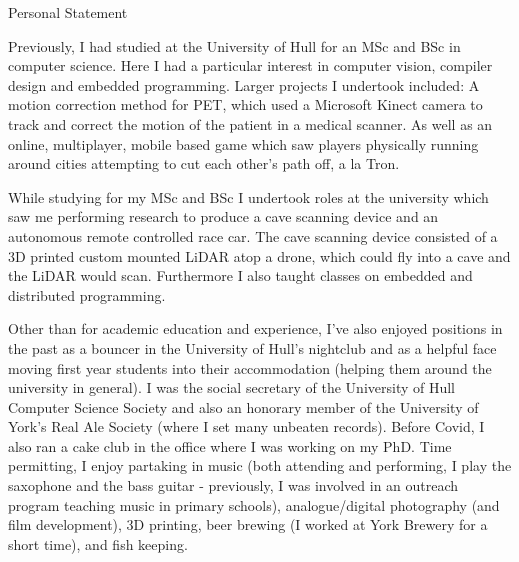 \documentclass{cv}
\begin{document}
\begin{rSection}{Personal Statement}
        \item Previously, I had studied at the University of Hull for an MSc and BSc in computer science. Here I had a particular interest in computer vision, compiler design and embedded programming. Larger projects I undertook included: A motion correction method for PET, which used a Microsoft Kinect camera to track and correct the motion of the patient in a medical scanner. As well as an online, multiplayer, mobile based game which saw players physically running around cities attempting to cut each other's path off, a la Tron.
        
        \item While studying for my MSc and BSc I undertook roles at the university which saw me performing research to produce a cave scanning device and an autonomous remote controlled race car. The cave scanning device consisted of a 3D printed custom mounted LiDAR atop a drone, which could fly into a cave and the LiDAR would scan. Furthermore I also taught classes on embedded and distributed programming.
        
        \item Other than for academic education and experience, I've also enjoyed positions in the past as a bouncer in the University of Hull's nightclub and as a helpful face moving first year students into their accommodation (helping them around the university in general). I was the social secretary of the University of Hull Computer Science Society and also an honorary member of the University of York's Real Ale Society (where I set many unbeaten records). Before Covid, I also ran a cake club in the office where I was working on my PhD. Time permitting, I enjoy partaking in music (both attending and performing, I play the saxophone and the bass guitar - previously, I was involved in an outreach program teaching music in primary schools), analogue/digital photography (and film development), 3D printing, beer brewing (I worked at York Brewery for a short time), and fish keeping.
    \end{rSection}

    \newpage
    
\end{document}

